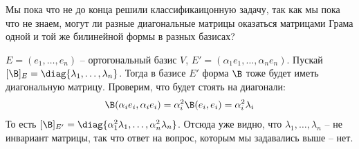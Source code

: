 Мы пока что не до конца решили классификаицонную задачу, так как мы пока что не знаем, могут ли разные диагональные матрицы оказаться матрицами Грама одной и той же 
билинейной формы в разных базисах?

\notice $E = (e_1, \dots, e_n)$ -- ортогональный базис $V$, $E' = (\alpha_1 e_1, \dots, \alpha_n e_n)$. Пускай 
$[\B]_E = \diag{\lambda_1, \dots, \lambda_n}$. Тогда в базисе $E'$ форма $\B$ тоже будет иметь диагональную матрицу. 
Проверим, что будет стоять на диагонали: 
\begin{gather*}
    \B(\alpha_i e_i, \alpha_i e_i) = \alpha_i^2 \B(e_i, e_i) = \alpha_i^2 \lambda_i
\end{gather*}
То есть $[\B]_{E'} = \diag{\alpha_1^2 \lambda_1, \dots, \alpha_n^2 \lambda_n}$. Отсюда уже видно, что $\lambda_1, \dots, \lambda_n$ -- не инвариант матрицы, так что ответ на вопрос, которым
мы задавались выше -- нет. 